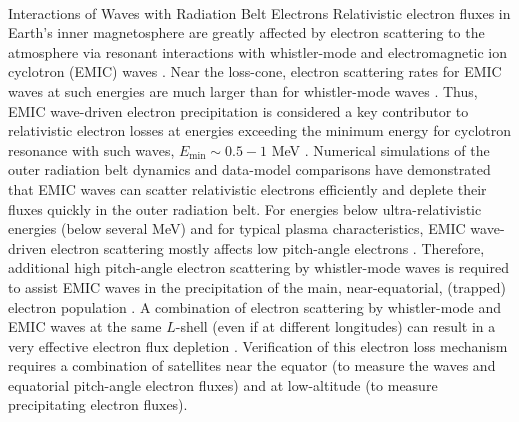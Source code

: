 \documentclass[
  letterpaper,
  DIV=11,
  numbers=noendperiod]{scrartcl}
\makeatletter
\let\oldparagraph\paragraph
\renewcommand{\paragraph}{
    \@ifstar
      \xxxParagraphStar
      \xxxParagraphNoStar
  }
\newcommand{\xxxParagraphStar}[1]{\oldparagraph*{#1}\mbox{}}
\newcommand{\xxxParagraphNoStar}[1]{\oldparagraph{#1}\mbox{}}
\makeatother
\begin{document}
\paragraph{Interactions of Waves with Radiation Belt Electrons}\label{interactions-of-waves-with-radiation-belt-electrons}
Relativistic electron fluxes in Earth's inner magnetosphere are greatly affected by electron scattering to the atmosphere via resonant interactions with whistler-mode and electromagnetic ion cyclotron (EMIC) waves \citep{millanReviewRadiationBelt2007, summersTimescalesRadiationBelt2007a}. Near the loss-cone, electron scattering rates for EMIC waves at such energies are much larger than for whistler-mode waves \citep{glauertCalculationPitchAngle2005}. Thus, EMIC wave-driven electron precipitation is considered a key contributor to relativistic electron losses at energies exceeding the minimum energy for cyclotron resonance with such waves, \(E_{\min}\sim 0.5-1\) MeV \citep{summersRelativisticElectronPitchangle2003, summersTimescalesRadiationBelt2007}. Numerical simulations of the outer radiation belt dynamics \citep{maModelingInwardDiffusion2015} and data-model comparisons \citep{angelopoulosEnergeticElectronPrecipitation2023} have demonstrated that EMIC waves can scatter relativistic electrons efficiently and deplete their fluxes quickly in the outer radiation belt.
For energies below ultra-relativistic energies (below several MeV) and for typical plasma characteristics, EMIC wave-driven electron scattering mostly affects low pitch-angle electrons \citep[equatorial \(\alpha_{eq}<30^\circ\), see][]{kerstenElectronLossesRadiation2014}. Therefore, additional high pitch-angle electron scattering by whistler-mode waves is required to assist EMIC waves in the precipitation of the main, near-equatorial, (trapped) electron population \citep{mourenasFastDropoutsMultiMeV2016}. A combination of electron scattering by whistler-mode and EMIC waves at the same \(L\)-shell (even if at different longitudes) can result in a very effective electron flux depletion \citep{mourenasFastDropoutsMultiMeV2016, drozdovDepletionsMultiMeVElectrons2022}. Verification of this electron loss mechanism requires a combination of satellites near the equator (to measure the waves and equatorial pitch-angle electron fluxes) and at low-altitude (to measure precipitating electron fluxes).
\end{document}
